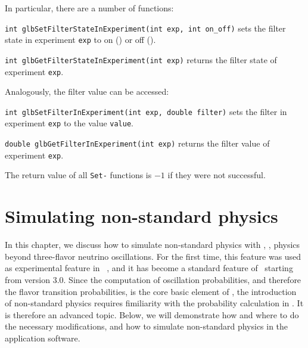 In particular, there are a number of functions:
\begin{function}
{\tt int glbSetFilterStateInExperiment(int exp, int on\_off)} sets the filter state in experiment {\tt exp} to on () or off ().
\end{function}
\begin{function}
{\tt int glbGetFilterStateInExperiment(int exp)} returns the filter state of experiment {\tt exp}.
\end{function}
Analogously, the filter value can be accessed:
\begin{function}
{\tt int glbSetFilterInExperiment(int exp, double filter)} sets the filter  in experiment {\tt exp} to the value {\tt value}.
\end{function}
\begin{function}
{\tt double glbGetFilterInExperiment(int exp)} returns the filter value of experiment {\tt exp}.
\end{function}
The return value of all {\tt Set-} functions is $-1$ if they were not successful.

\chapter{Simulating non-standard physics}
\label{chapt:nsphysics}

In this chapter, we discuss how to simulate non-standard physics with \GLOBES , \ie, physics
beyond three-flavor neutrino oscillations. For the first time, this feature was used as experimental 
feature in \Ref~\cite{Blennow:2005yk},
and it has become a standard feature of \GLOBES\ starting from version 3.0. Since the 
computation of oscillation probabilities, and therefore the flavor transition probabilities, is the core basic
element of \GLOBES , the introduction of non-standard physics requires fimiliarity with the
probability calculation in \GLOBES . It is therefore an advanced topic.
Below, we will demonstrate how and where to do the necessary modifications, and how to simulate non-standard
physics in the application software.

